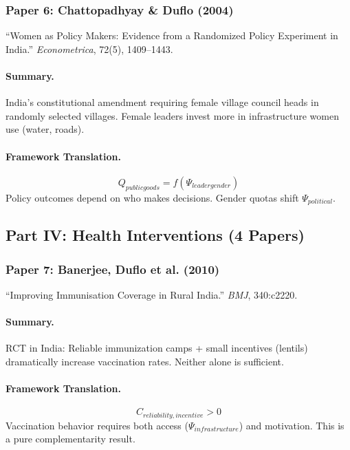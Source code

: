 \documentclass[12pt,a4paper]{article}
\begin{document}
\subsubsection{Paper 6: Chattopadhyay \& Duflo (2004)}

``Women as Policy Makers: Evidence from a Randomized Policy Experiment in India.''
\textit{Econometrica}, 72(5), 1409--1443.

\paragraph{Summary.}
India's constitutional amendment requiring female village council heads in randomly
selected villages. Female leaders invest more in infrastructure women use (water, roads).

\paragraph{Framework Translation.}
\begin{equation}
  Q_{public goods} = f(\Psi_{leader gender})
\end{equation}
Policy outcomes depend on who makes decisions. Gender quotas shift $\Psi_{political}$.

\subsection{Part IV: Health Interventions (4 Papers)}

\subsubsection{Paper 7: Banerjee, Duflo et al. (2010)}

``Improving Immunisation Coverage in Rural India.''
\textit{BMJ}, 340:c2220.

\paragraph{Summary.}
RCT in India: Reliable immunization camps + small incentives (lentils) dramatically
increase vaccination rates. Neither alone is sufficient.

\paragraph{Framework Translation.}
\begin{equation}
  C_{reliability, incentive} > 0
\end{equation}
Vaccination behavior requires both access ($\Psi_{infrastructure}$) and motivation.
This is a pure complementarity result.
\end{document}
